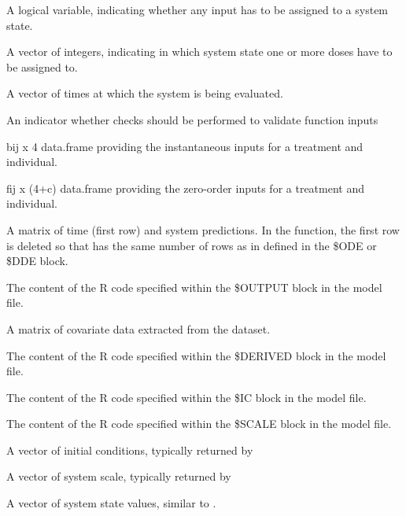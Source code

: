 \begin{Arguments}
\begin{ldescription}
\item[\code{has.dosing}] A logical variable, indicating whether any input has to
be assigned to a system state.
\item[\code{dose.states}] A vector of integers, indicating in which system state one
or more doses have to be assigned to.
\item[\code{xdata}] A vector of times at which the system is being evaluated.
\item[\code{check}] An indicator whether checks should be performed to validate 
function inputs
\item[\code{bolus}] bij x 4 data.frame providing the instantaneous inputs for a 
treatment and individual.
\item[\code{infusion}] fij x (4+c) data.frame providing the zero-order inputs for a
treatment and individual.
\item[\code{f}] A matrix of time (first row) and system predictions. In the 
 function, the first row is deleted so that  has
the same number of rows as in  defined in the \$ODE or \$DDE block.
\item[\code{codeoutput}] The content of the R code specified within the \$OUTPUT block 
in the model file.
\item[\code{covdata}] A matrix of covariate data extracted from the dataset.
\item[\code{codederiv}] The content of the R code specified within the \$DERIVED block 
in the model file.
\item[\code{codeic}] The content of the R code specified within the \$IC block in the 
model file.
\item[\code{codescale}] The content of the R code specified within the \$SCALE block 
in the model file.
\item[\code{ic}] A vector of initial conditions, typically returned by 
\item[\code{scale}] A vector of system scale, typically returned by 
\item[\code{a}] A vector of system state values, similar to .
\end{ldescription}
\end{Arguments}
%
